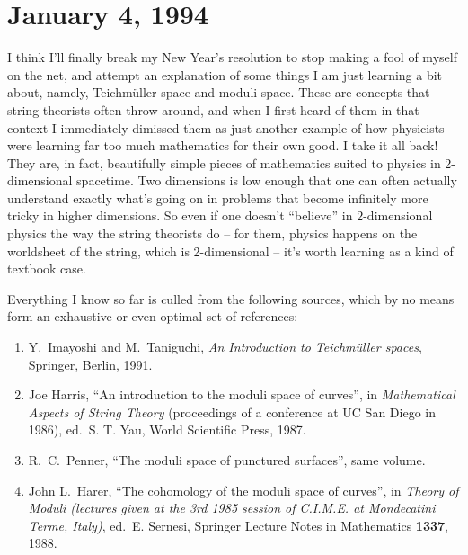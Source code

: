 \documentclass{article}
\begin{document}
\hypertarget{week28}{%
\section{January 4, 1994}\label{week28}}

I think I'll finally break my New Year's resolution to stop making a
fool of myself on the net, and attempt an explanation of some things I
am just learning a bit about, namely, Teichm\"uller space and moduli
space. These are concepts that string theorists often throw around, and
when I first heard of them in that context I immediately dimissed them
as just another example of how physicists were learning far too much
mathematics for their own good. I take it all back! They are, in fact,
beautifully simple pieces of mathematics suited to physics in
2-dimensional spacetime. Two dimensions is low enough that one can often
actually understand exactly what's going on in problems that become
infinitely more tricky in higher dimensions. So even if one doesn't
``believe'' in \(2\)-dimensional physics the way the string theorists do
-- for them, physics happens on the worldsheet of the string, which is
2-dimensional -- it's worth learning as a kind of textbook case.

Everything I know so far is culled from the following sources, which by
no means form an exhaustive or even optimal set of references:

\begin{enumerate}
\def\labelenumi{\arabic{enumi})}
\item
  Y.\ Imayoshi and M.\  Taniguchi, \emph{An Introduction to Teichm\"uller spaces}, Springer, Berlin, 1991.
\item
  Joe Harris, ``An introduction to the moduli space of curves'', in
  \emph{Mathematical Aspects of String Theory} (proceedings of a
  conference at UC San Diego in 1986), ed.~S. T. Yau, World Scientific
  Press, 1987.
\item 
R.\ C.\ Penner, ``The moduli space of punctured surfaces'', same
volume.
\item
   John L.\ Harer, ``The cohomology of the moduli space of curves'', in
  \emph{Theory of Moduli (lectures given at the 3rd 1985 session of
  C.I.M.E. at Mondecatini Terme, Italy)}, ed.~E. Sernesi,
  Springer Lecture Notes in Mathematics \textbf{1337}, 1988.
\end{enumerate}
\end{document}

